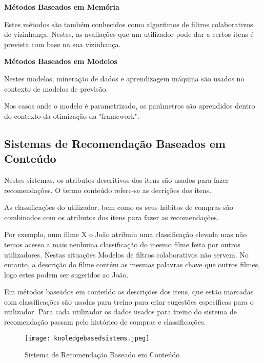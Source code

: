 \begin{center}
\normalsize{\bfseries Métodos Baseados em Memória}\hfill
\end{center}
\par\hfill
 \par Estes métodos são também conhecidos como algoritmos de filtros colaborativos de vizinhança. Nestes, as avaliações que um utilizador pode dar a certos itens é prevista com base na sua vizinhança.\newline


\begin{center}
\normalsize{\bfseries Métodos Baseados em Modelos}\hfill
\end{center}
\par\hfill
\par Nestes modelos, mineração de dados e aprendizagem máquina são usados no contexto de modelos de previsão.
\par Nos casos onde o modelo é parametrizado, os parâmetros são aprendidos dentro do contexto da otimização da "framework".


\subsection{Sistemas de Recomendação Baseados em Conteúdo}
\par\hfill
\par Nestes sistemas, os atributos descritivos dos itens são usados para fazer recomendações. O termo conteúdo refere-se as decrições dos itens. 
\par As classificações do utilizador, bem como os seus hábitos de compras são combinados com os atributos dos itens para fazer as recomendações. 
\par Por exemplo, num filme X o João atribuiu uma classificação elevada mas não temos acesso a mais nenhuma classificação do mesmo filme feita por outros utilizadores. Nestas situações Modelos de filtros colaborativos não servem. No entanto, a descrição do filme contém as mesmas palavras chave que outros filmes, logo estes podem ser sugeridos ao João.
\par Em métodos baseados em conteúdo as descrições dos itens, que estão marcadas com classificações são usadas para treino para criar sugestões especificas para o utilizador. Para cada utilizador os dados usados para treino do sistema de recomendação passam pelo histórico de compras e classificações.
\begin{figure}[H]
  \centering
    \texttt{[image: knoledgebasedsistems.jpeg]}
    \caption{Sistema de Recomendação Baseado em Conteúdo}
    \label{fig03}
\end{figure}


